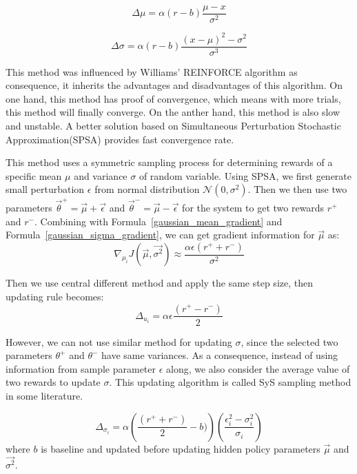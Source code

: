 \documentclass[officiallayout]{tktla}
\begin{document}
\begin{equation}
\Delta \mu = \alpha (r - b)\frac{\mu - x}{\sigma^2}
\label{wiliams_update_mean}
\end{equation}

\begin{equation}
\Delta \sigma = \alpha (r - b)\frac{(x-\mu)^2 - \sigma^2}{\sigma^3}
\label{wiliams_update_sigma}
\end{equation}

This method was influenced by Williams' REINFORCE algorithm as consequence, it inherits the advantages and disadvantages of this algorithm. On one hand, this method has proof of convergence, which means with more trials, this method will finally converge. On the anther hand, this method is also slow and unstable. A better solution based on Simultaneous Perturbation Stochastic Approximation(SPSA) provides fast convergence rate.

This method uses a symmetric sampling process for determining rewards of a specific mean $\mu$ and variance $\sigma$ of random variable. Using SPSA, we first generate small perturbation $\epsilon$ from normal distribution $\mathcal{N}(0, \sigma^2)$. Then we then use two parameters $\vec{\theta}^+ = \vec{\mu} + \vec{\epsilon}$ and $\vec{\theta}^- = \vec{\mu} - \vec{\epsilon}$ for the system to get two rewards $r^+$ and $r^-$. Combining with Formula~\ref{gaussian_mean_gradient} and Formula~\ref{gaussian_sigma_gradient}, we can get gradient information for $\vec{\mu}$ as:
\begin{equation}
\nabla_{\mu_i}J(\vec{\mu}, \vec{\sigma^2}) \approx \frac{\alpha\epsilon(r^+ + r^-)}{\sigma^2}
\end{equation}

Then we use central different method and apply the same step size, then updating rule becomes:
\begin{equation}
\Delta_{u_i} = \alpha \epsilon \frac{(r^+ - r^-)}{2}
\label{sys_update_mu}
\end{equation}

However, we can not use similar method for updating $\sigma$, since the selected two parameters $\theta^+$ and $\theta^-$ have same variances. As a consequence, instead of using information from sample parameter $\epsilon$ along, we also consider the average value of two rewards to update $\sigma$. This updating algorithm is called SyS sampling method in some literature.\cite{sehnke2013efficient}

\begin{equation}
\Delta_{\sigma_i} = \alpha \left(\frac{(r^+ + r^-)}{2} - b) \right)\left(\frac{\epsilon_i^2 - \sigma_i^2}{\sigma_i}\right)
\label{sys_update_sigma}
\end{equation}
where $b$ is baseline and updated before updating hidden policy parameters $\vec{\mu}$ and $\vec{\sigma^2}$.
\end{document}
